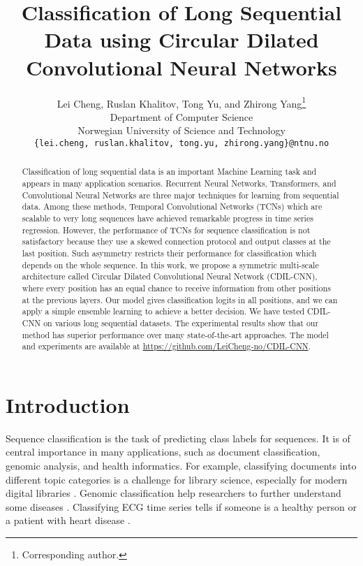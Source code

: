 \documentclass{article}
\title{Classification of Long Sequential Data using Circular Dilated Convolutional Neural Networks
}
\author{
  Lei Cheng, Ruslan Khalitov, Tong Yu, and Zhirong Yang\thanks{Corresponding author.} \\
  Department of Computer Science \\
  Norwegian University of Science and Technology \\
\texttt{\{lei.cheng, ruslan.khalitov, tong.yu, zhirong.yang\}@ntnu.no} \\
}
\begin{document}
\maketitle


\begin{abstract}
Classification of long sequential data is an important Machine Learning task and appears in many application scenarios. Recurrent Neural Networks, Transformers, and Convolutional Neural Networks are three major techniques for learning from sequential data. Among these methods, Temporal Convolutional Networks (TCNs) which are scalable to very long sequences have achieved remarkable progress in time series regression. However, the performance of TCNs for sequence classification is not satisfactory because they use a skewed connection protocol and output classes at the last position. Such asymmetry restricts their performance for classification which depends on the whole sequence. In this work, we propose a symmetric multi-scale architecture called Circular Dilated Convolutional Neural Network (CDIL-CNN), where every position has an equal chance to receive information from other positions at the previous layers. Our model gives classification logits in all positions, and we can apply a simple ensemble learning to achieve a better decision. We have tested CDIL-CNN on various long sequential datasets. The experimental results show that our method has superior performance over many state-of-the-art approaches. The model and experiments are available at \url{https://github.com/LeiCheng-no/CDIL-CNN}.
\end{abstract}




\section{Introduction}
\label{sec:introduction}

Sequence classification is the task of predicting class labels for sequences. It is of central importance in many applications, such as document classification, genomic analysis, and health informatics. For example, classifying documents into different topic categories is a challenge for library science, especially for modern digital libraries \cite{khan2010review}. Genomic classification help researchers to further understand some diseases \cite{akbani2015genomic}. Classifying ECG time series tells if someone is a healthy person or a patient with heart disease \cite{led2004design}.
\end{document}
